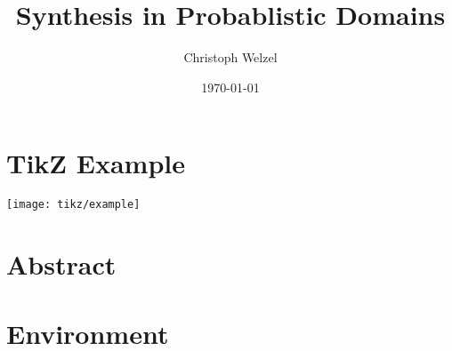 \documentclass[twoside, a4paper, fontsize=12pt, draft]{scrbook}
\title{Synthesis in Probablistic Domains}
\author{Christoph Welzel}
\date{\today}
\begin{document}
\maketitle
\listoffixmes
\frontmatter
\chapter{TikZ Example}
\texttt{[image: tikz/example]}
\mainmatter
\chapter{Abstract}
\chapter{Environment}
\backmatter
\end{document}

